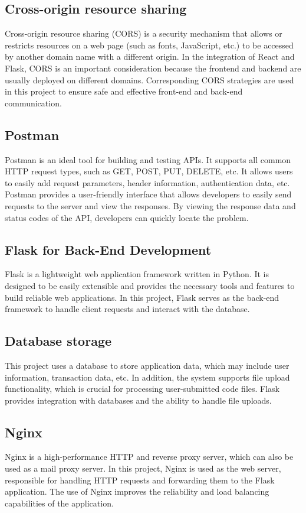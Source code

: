 \documentclass[journal]{IEEEtran}
\begin{document}
\subsection{Cross-origin resource sharing}
Cross-origin resource sharing (CORS) is a security mechanism that allows or restricts resources on a web page (such as fonts, JavaScript, etc.) to be accessed by another domain name with a different origin. In the integration of React and Flask, CORS is an important consideration because the frontend and backend are usually deployed on different domains. Corresponding CORS strategies are used in this project to ensure safe and effective front-end and back-end communication.

\subsection{Postman}
Postman is an ideal tool for building and testing APIs. It supports all common HTTP request types, such as GET, POST, PUT, DELETE, etc. It allows users to easily add request parameters, header information, authentication data, etc. Postman provides a user-friendly interface that allows developers to easily send requests to the server and view the responses. By viewing the response data and status codes of the API, developers can quickly locate the problem.

\subsection{Flask for Back-End Development}
Flask is a lightweight web application framework written in Python. It is designed to be easily extensible and provides the necessary tools and features to build reliable web applications. In this project, Flask serves as the back-end framework to handle client requests and interact with the database.

\subsection{Database storage}
This project uses a database to store application data, which may include user information, transaction data, etc. In addition, the system supports file upload functionality, which is crucial for processing user-submitted code files. Flask provides integration with databases and the ability to handle file uploads.

\subsection{Nginx}
Nginx is a high-performance HTTP and reverse proxy server, which can also be used as a mail proxy server. In this project, Nginx is used as the web server, responsible for handling HTTP requests and forwarding them to the Flask application. The use of Nginx improves the reliability and load balancing capabilities of the application.
\end{document}

